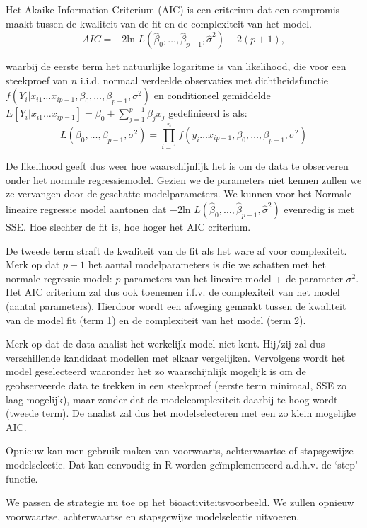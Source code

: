 \documentclass[12pt,dutch,coursenotes]{book}
\theoremstyle{definition}
\theoremstyle{definition}
\theoremstyle{definition}
\theoremstyle{remark}
\begin{document}
Het Akaike Information Criterium (AIC) is een criterium dat een
compromis maakt tussen de kwaliteit van de fit en de complexiteit van
het model.
\[AIC = -2 \text{ln } L(\hat \beta_0, \ldots, \hat \beta_{p-1}, \hat \sigma^2) + 2 (p+1),\]

waarbij de eerste term het natuurlijke logaritme is van likelihood, die
voor een steekproef van \(n\) i.i.d. normaal verdeelde observaties met
dichtheidsfunctie
\(f(Y_i \vert x_{i1} \ldots x_{ip-1}, \beta_0,\ldots, \beta_{p-1} ,\sigma^2)\)
en conditioneel gemiddelde
\(E[Y_i \vert x_{i1} \ldots x_{ip-1}]=\beta_0 + \sum_{j=1}^{p-1} \beta_j x_{j}\)
gedefinieerd is als: \[
L(\beta_0, \ldots, \beta_{p-1}, \sigma^2) = \prod\limits_{i=1}^n f(y_i \ldots x_{ip-1}, \beta_0,\ldots, \beta_{p-1} ,\sigma^2)  
\]

De likelihood geeft dus weer hoe waarschijnlijk het is om de data te
observeren onder het normale regressiemodel. Gezien we de parameters
niet kennen zullen we ze vervangen door de geschatte modelparameters. We
kunnen voor het Normale lineaire regressie model aantonen dat
\(-2 \text{ln } L(\hat \beta_0, \ldots, \hat \beta_{p-1}, \hat \sigma^2)\)
evenredig is met SSE. Hoe slechter de fit is, hoe hoger het AIC
criterium.

De tweede term straft de kwaliteit van de fit als het ware af voor
complexiteit. Merk op dat \(p+1\) het aantal modelparameters is die we
schatten met het normale regressie model: \(p\) parameters van het
lineaire model + de parameter \(\sigma^2\). Het AIC criterium zal dus
ook toenemen i.f.v. de complexiteit van het model (aantal parameters).
Hierdoor wordt een afweging gemaakt tussen de kwaliteit van de model fit
(term 1) en de complexiteit van het model (term 2).

Merk op dat de data analist het werkelijk model niet kent. Hij/zij zal
dus verschillende kandidaat modellen met elkaar vergelijken. Vervolgens
wordt het model geselecteerd waaronder het zo waarschijnlijk mogelijk is
om de geobserveerde data te trekken in een steekproef (eerste term
minimaal, SSE zo laag mogelijk), maar zonder dat de modelcomplexiteit
daarbij te hoog wordt (tweede term). De analist zal dus het
modelselecteren met een zo klein mogelijke AIC.

Opnieuw kan men gebruik maken van voorwaarts, achterwaartse of
stapsgewijze modelselectie. Dat kan eenvoudig in R worden
geïmplementeerd a.d.h.v. de `step' functie.

We passen de strategie nu toe op het bioactiviteitsvoorbeeld. We zullen
opnieuw voorwaartse, achterwaartse en stapsgewijze modelselectie
uitvoeren.
\end{document}
